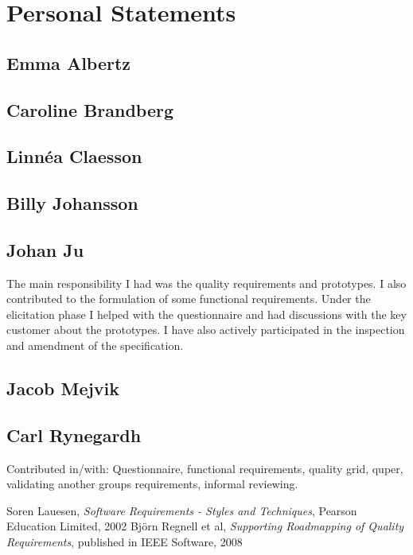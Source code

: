 \documentclass[10pt,a4paper]{article}
\begin{document}
\section{Personal Statements}

\subsection{Emma Albertz}

\subsection{Caroline Brandberg}

\subsection{Linn\'ea Claesson}

\subsection{Billy Johansson}

\subsection{Johan Ju}
The main responsibility I had was the quality requirements and prototypes. I also contributed to the formulation of some functional requirements. Under the elicitation phase I helped with the questionnaire and had discussions with the key customer about the prototypes. I have also actively participated in the inspection and amendment of the specification.

\subsection{Jacob Mejvik}

\subsection{Carl Rynegardh}
Contributed in/with: Questionnaire, functional requirements, quality grid, quper, validating another groups requirements, informal reviewing.

\begin{thebibliography}{99}
	Soren Lauesen,
  	\emph{Software Requirements - Styles and Techniques},
  	Pearson Education Limited, 2002
	Björn Regnell et al,
	\emph{Supporting Roadmapping of Quality Requirements},
	published in IEEE Software, 2008

\end{thebibliography}
\end{document}
